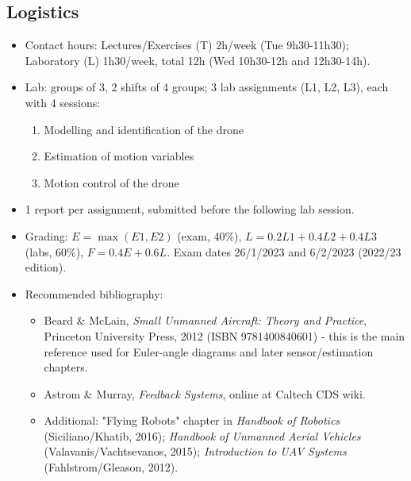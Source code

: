 \documentclass[11pt]{article}
\begin{document}
\subsection{Logistics}
\begin{itemize}
\item Contact hours: Lectures/Exercises (T) 2h/week (Tue 9h30-11h30); Laboratory (L) 1h30/week, total 12h (Wed 10h30-12h and 12h30-14h).
\item Lab: groups of 3, 2 shifts of 4 groups; 3 lab assignments (L1, L2, L3), each with 4 sessions:
\begin{enumerate}
\item Modelling and identification of the drone
\item Estimation of motion variables
\item Motion control of the drone
\end{enumerate}
\item 1 report per assignment, submitted before the following lab session.
\item Grading: $E = \max(E1, E2)$ (exam, 40\%), $L = 0.2 L1 + 0.4 L2 + 0.4 L3$ (labs, 60\%), $F = 0.4 E + 0.6 L$. Exam dates 26/1/2023 and 6/2/2023 (2022/23 edition).
\item Recommended bibliography:
\begin{itemize}
\item Beard \& McLain, \textit{Small Unmanned Aircraft: Theory and Practice}, Princeton University Press, 2012 (ISBN 9781400840601) - this is the main reference used for Euler-angle diagrams and later sensor/estimation chapters.
\item Astrom \& Murray, \textit{Feedback Systems}, online at Caltech CDS wiki.
\item Additional: "Flying Robots" chapter in \textit{Handbook of Robotics} (Siciliano/Khatib, 2016); \textit{Handbook of Unmanned Aerial Vehicles} (Valavanis/Vachtsevanos, 2015); \textit{Introduction to UAV Systems} (Fahlstrom/Gleason, 2012).
\end{itemize}
\end{itemize}
\end{document}
